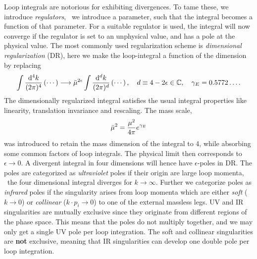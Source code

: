 Loop integrals are notorious for exhibiting divergences. To tame these, we introduce \textit{regulators}, \ie\ we introduce a parameter, such that the integral becomes a function of that parameter. For a suitable regulator is used, the integral will now converge if the regulator is set to an unphysical value, and has a pole at the physical value. The most commonly used regularization scheme is \textit{dimensional regularization} (\acs{DR}), here we make the loop-integral a function of the dimension by replacing
\begin{equation}
\int \frac{\mathrm{d}^4 k}{(2 \pi)^4} \left( \cdots \right) \longrightarrow \bar{\mu}^{2 \epsilon} \int \frac{\mathrm{d}^d k}{(2 \pi)^d} \left( \cdots \right), \quad d \equiv 4 - 2 \epsilon \in \mathbb{C}, \quad \gamma_E =  0.5772\ldots.
\end{equation}
The dimensionally regularized integral satisfies the usual integral properties like linearity, translation invariance and rescaling. The mass scale,
\begin{equation}
\bar{\mu}^2 = \frac{\mu^2}{4 \pi} e^{\gamma_E}
\end{equation}
was introduced to retain the mass dimension of the integral to 4, while absorbing some common factors of loop integrals. The physical limit then corresponds to $\epsilon \rightarrow 0$. A divergent integral in four dimensions will hence have $\epsilon$-poles in \acs{DR}. The poles are categorized as \textit{ultraviolet} poles if their origin are large loop momenta, \ie\ the four dimensional integral diverges for $k \rightarrow \infty$. Further we categorize poles as \textit{infrared} poles if the singularity arises from loop momenta which are either \textit{soft} ($k \rightarrow 0$) or \textit{collinear} ($k \cdot p_i \rightarrow 0$) to one of the external massless legs. \acs{UV} and \acs{IR} singularities are mutually exclusive since they originate from different regions of the phase space. This means that the poles do not multiply together, and we may only get a single \acs{UV} pole per loop integration. The soft and collinear singularities are \textbf{not} exclusive, meaning that \acs{IR} singularities can develop one double pole per loop integration.

